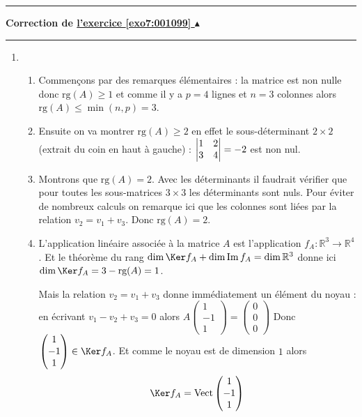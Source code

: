 \documentclass[11pt,a4paper]{article}
\newcommand{\Rr}{\mathbb{R}} \newcommand{\R}{\mathbb{R}}
\renewcommand{\Im}{\mathop{\mathrm{Im}}\nolimits}
\renewcommand{\ge}{\geqslant} \renewcommand{\geq}{\geqslant}
\renewcommand{\le}{\leqslant} \renewcommand{\leq}{\leqslant}
\newcounter{exo}
\newcommand{\correction}[1]{\hypertarget{cor7:#1}{}\label{cor7:#1}{\bf Correction de \hyperlink{exo7:#1}{l'exercice \ref{exo7:#1} $\blacktriangle$}}\vspace{1mm}\hrule\vspace{1mm}}
\newcommand{\fincorrection}{\vspace{1mm}\hrule\vspace*{7mm}}
\begin{document}
\fincorrection
\correction{001099}
\begin{enumerate}
  \item 
  \begin{enumerate}
     \item Commençons par des remarques élémentaires : la matrice est non nulle donc $\textrm{rg}(A) \ge 1$
et comme il y a $p=4$ lignes et $n=3$ colonnes alors $\textrm{rg}(A) \le \min(n,p)=3$.

     \item Ensuite on va montrer $\textrm{rg}(A) \ge 2$ en effet le sous-déterminant $2\times 2$ 
(extrait du coin en haut à gauche) :
$\begin{vmatrix} 
1 & 2 \cr
3 & 4 \cr
\end{vmatrix}= -2$ est non nul.

     \item Montrons que $\textrm{rg}(A)=2$. Avec les déterminants il faudrait vérifier que pour toutes
les sous-matrices $3\times 3$ les déterminants sont nuls. Pour éviter de nombreux calculs on remarque ici
que les colonnes sont liées par la relation $v_2=v_1+v_3$. Donc $\textrm{rg}(A)=2$.

     \item L'application linéaire associée à la matrice $A$ est l'application 
$f_A : \Rr^3 \to \Rr^4$. Et le théorème du rang 
$\dim \Ker f_A+ \dim \Im f_A = \dim \Rr^3$ donne ici
$\dim \Ker f_A = 3 - \textrm{rg}(A)=1$.

Mais la relation $v_2=v_1+v_3$ donne immédiatement un élément du noyau :
en écrivant $v_1-v_2+v_3=0$ alors $A\begin{pmatrix}1\\-1\\1\end{pmatrix}=\begin{pmatrix}0\\0\\0\end{pmatrix}$
Donc $\begin{pmatrix}1\\-1\\1\end{pmatrix} \in \Ker f_A$. Et comme le noyau est de dimension $1$ alors
$$\Ker f_A = \textrm{Vect} \begin{pmatrix}1\\-1\\1\end{pmatrix}$$


\end{enumerate}
\end{enumerate}
\end{document}

